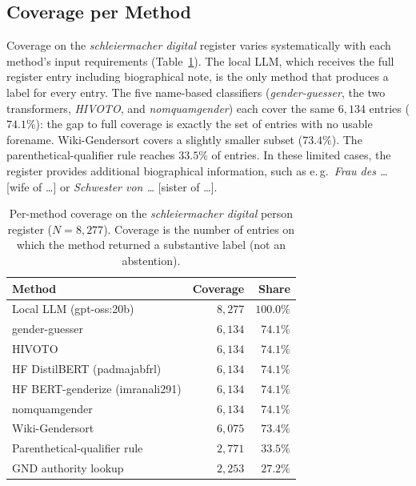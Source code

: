 \documentclass{eceasst}
\newcommand{\eg}{e.\,g.}
\begin{document}
\subsection{Coverage per Method} Coverage on the \textit{schleiermacher digital} register varies systematically with each method's input requirements (Table~\ref{tab:coverage}). The local LLM, which receives the full register entry including biographical note, is the only method that produces a label for every entry. The five name-based classifiers (\textit{gender-guesser}, the two transformers, \textit{HIVOTO}, and \textit{nomquamgender}) each cover the same $6{,}134$ entries ($74.1\%$): the gap to full coverage is exactly the set of entries with no usable forename. Wiki-Gendersort covers a slightly smaller subset ($73.4\%$). The parenthetical-qualifier rule reaches $33.5\%$ of entries. In these limited cases, the register provides additional biographical information, such as \eg{}~\textit{Frau des \dots} [wife of \dots] or \textit{Schwester von \dots} [sister of \dots].

\begin{table}[h]
  \centering
  \small
  \setlength{\tabcolsep}{4pt}
  \begin{tabular}{lrr}
    \toprule
    Method & Coverage & Share \\
    \midrule
    Local LLM (gpt-oss:20b)        & $8{,}277$ & $100.0\%$ \\
    gender-guesser                 & $6{,}134$ & $74.1\%$  \\
    HIVOTO                         & $6{,}134$ & $74.1\%$  \\
    HF DistilBERT (padmajabfrl)    & $6{,}134$ & $74.1\%$  \\
    HF BERT-genderize (imranali291)& $6{,}134$ & $74.1\%$  \\
    nomquamgender                  & $6{,}134$ & $74.1\%$  \\
    Wiki-Gendersort                & $6{,}075$ & $73.4\%$  \\
    Parenthetical-qualifier rule   & $2{,}771$ & $33.5\%$  \\
    GND authority lookup           & $2{,}253$ & $27.2\%$  \\
    \bottomrule
  \end{tabular}
  \caption{Per-method coverage on the \textit{schleiermacher digital} person register ($N = 8{,}277$). Coverage is the number of entries on which the method returned a substantive label (not an abstention).}
  \label{tab:coverage}
\end{table}
\end{document}
